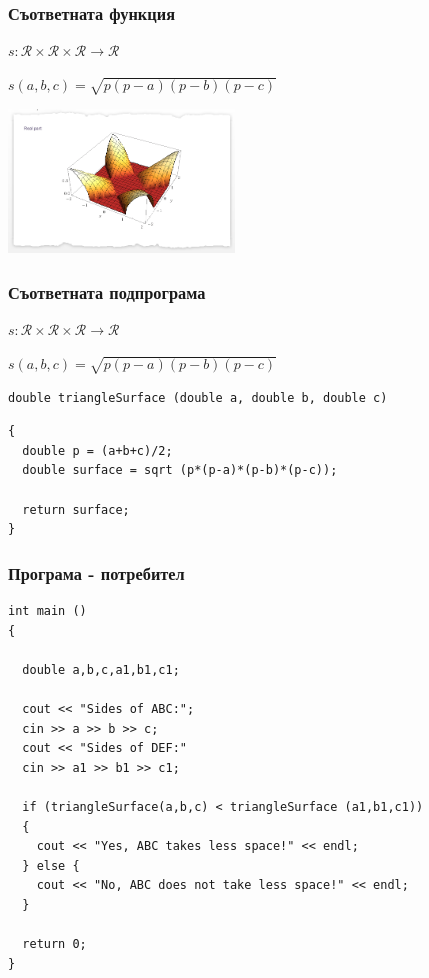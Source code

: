 \documentclass{beamer}
\begin{document}
\begin{frame}[fragile]
\frametitle{Съответната функция}

$s:\mathcal{R}\times\mathcal{R}\times\mathcal{R} \rightarrow \mathcal{R}$


$s(a,b,c)=\sqrt{p(p-a)(p-b)(p-c)}$


\begin{center}
\includegraphics[width=6cm]{images/heron}  
\end{center}


\end{frame}
\begin{frame}[fragile]
\frametitle{Съответната подпрограма}

$s:\mathcal{R}\times\mathcal{R}\times\mathcal{R} \rightarrow \mathcal{R}$

$s(a,b,c)=\sqrt{p(p-a)(p-b)(p-c)}$

\pause

\begin{flushleft}
\begin{lstlisting}
double triangleSurface (double a, double b, double c)
\end{lstlisting}\pause\begin{lstlisting}
{
  double p = (a+b+c)/2;
  double surface = sqrt (p*(p-a)*(p-b)*(p-c));

  return surface;
}
\end{lstlisting}
\end{flushleft}


\end{frame}

\begin{frame}[fragile]
\frametitle{Програма - потребител}

\begin{flushleft}
\begin{lstlisting}
int main ()
{
  
  double a,b,c,a1,b1,c1;

  cout << "Sides of ABC:";
  cin >> a >> b >> c;
  cout << "Sides of DEF:"
  cin >> a1 >> b1 >> c1;

  if (triangleSurface(a,b,c) < triangleSurface (a1,b1,c1))
  {
    cout << "Yes, ABC takes less space!" << endl;
  } else {    
    cout << "No, ABC does not take less space!" << endl;
  }

  return 0;
}
\end{lstlisting}
\end{flushleft}


\end{frame}
\end{document}

